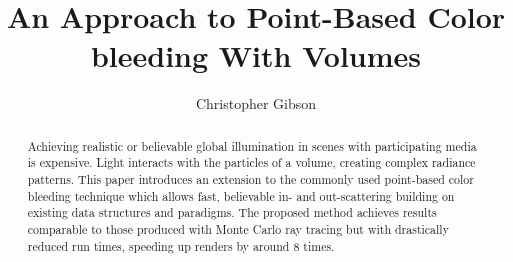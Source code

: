 \documentclass[12pt]{ucthesis}
\begin{document}

\title{An Approach to Point-Based Color bleeding With Volumes}
\author{Christopher Gibson}
  
 
     



\maketitle

\begin{frontmatter}

\copyrightpage

\committeemembershippage

\begin{abstract}

Achieving realistic or believable global illumination in scenes with participating media is expensive.  Light interacts with the particles of a volume, creating complex radiance patterns.  This paper introduces an extension to the commonly used point-based color bleeding technique which allows fast, believable in- and out-scattering building on existing data structures and paradigms.  The proposed method achieves results comparable to those produced with Monte Carlo ray tracing but with drastically reduced run times, speeding up renders by around 8 times. 

\end{abstract}





\tableofcontents


\listoftables

\listoffigures

\end{frontmatter}

\pagestyle{plain}




\renewcommand{\baselinestretch}{1.66}
\end{document}

